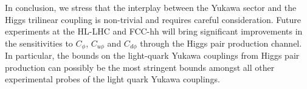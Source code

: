 In conclusion, we stress that the interplay between the Yukawa sector and the Higgs trilinear coupling is non-trivial and requires careful consideration. Future experiments at the HL-LHC and FCC-hh will bring significant improvements in the sensitivities to $C_\phi$, $C_{u\phi}$ and $C_{d\phi}$ through the Higgs pair production channel. In particular, the bounds on the light-quark Yukawa couplings from Higgs pair production can possibly be the most stringent bounds amongst all other experimental probes of the light quark Yukawa couplings.






